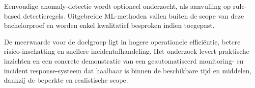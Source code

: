 Eenvoudige anomaly-detectie wordt optioneel onderzocht, als aanvulling op rule-based detectieregels. 
Uitgebreide ML-methoden vallen buiten de scope van deze bachelorproef en worden enkel kwalitatief besproken indien toegepast.

De meerwaarde voor de doelgroep ligt in hogere operationele efficiëntie, betere risico-inschatting en snellere incidentafhandeling. 
Het onderzoek levert praktische inzichten en een concrete demonstratie van een geautomatiseerd monitoring- en incident response-systeem dat 
haalbaar is binnen de beschikbare tijd en middelen, dankzij de beperkte en realistische scope.
